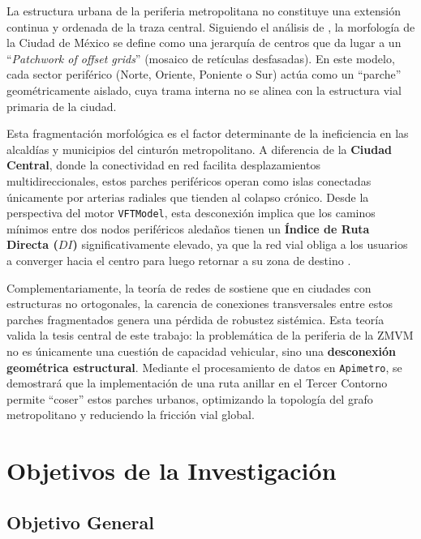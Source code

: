 La estructura urbana de la periferia metropolitana no constituye una extensión continua y ordenada de la traza central. 
Siguiendo el análisis de \textcite{ortiz2007}, la morfología de la Ciudad de México se define como una jerarquía de centros que da 
lugar a un ``\textit{Patchwork of offset grids}'' (mosaico de retículas desfasadas). En este modelo, cada sector periférico 
(Norte, Oriente, Poniente o Sur) actúa como un ``parche'' geométricamente aislado, cuya trama interna no se alinea con 
la estructura vial primaria de la ciudad.

Esta fragmentación morfológica es el factor determinante de la ineficiencia en las alcaldías y municipios del cinturón metropolitano. 
A diferencia de la \textbf{Ciudad Central}, donde la conectividad en red facilita desplazamientos multidireccionales, estos parches 
periféricos operan como islas conectadas únicamente por arterias radiales que tienden al colapso crónico. Desde la perspectiva del 
motor \texttt{VFTModel}, esta desconexión implica que los caminos mínimos entre dos nodos periféricos aledaños tienen 
un \textbf{Índice de Ruta Directa ($DI$)} significativamente elevado, ya que la red vial obliga a los usuarios a converger hacia 
el centro para luego retornar a su zona de destino \parencite{fortin2016innovative}.

Complementariamente, la teoría de redes de \textcite{owais2020} sostiene que en ciudades con estructuras no ortogonales, 
la carencia de conexiones transversales entre estos parches fragmentados genera una pérdida de robustez sistémica. 
Esta teoría valida la tesis central de este trabajo: la problemática de la periferia de la ZMVM no es únicamente una cuestión de 
capacidad vehicular, sino una \textbf{desconexión geométrica estructural}. Mediante el procesamiento de datos en \texttt{Apimetro}, 
se demostrará que la implementación de una ruta anillar en el Tercer Contorno permite ``coser'' estos parches urbanos, 
optimizando la topología del grafo metropolitano y reduciendo la fricción vial global.

\section{Objetivos de la Investigación}
\label{sec:objetivos}

\subsection{Objetivo General}
\label{subsec:obj-general}

